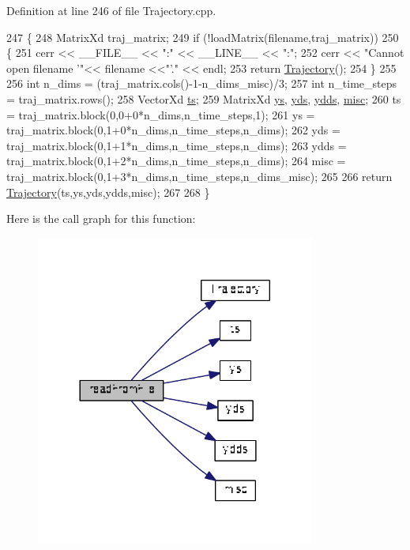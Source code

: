 Definition at line 246 of file Trajectory.\+cpp.


\begin{DoxyCode}
247 \{
248   MatrixXd traj\_matrix;
249   \textcolor{keywordflow}{if} (!loadMatrix(filename,traj\_matrix))
250   \{ 
251     cerr << \_\_FILE\_\_ << \textcolor{stringliteral}{":"} << \_\_LINE\_\_ << \textcolor{stringliteral}{":"};
252     cerr << \textcolor{stringliteral}{"Cannot open filename '"}<< filename <<\textcolor{stringliteral}{"'."} << endl;
253     \textcolor{keywordflow}{return} \hyperlink{classDmpBbo_1_1Trajectory_aa635b61a4223224b821d156a27dbb2b8}{Trajectory}();
254   \}
255   
256   \textcolor{keywordtype}{int} n\_dims       = (traj\_matrix.cols()-1-n\_dims\_misc)/3;
257   \textcolor{keywordtype}{int} n\_time\_steps = traj\_matrix.rows();
258   VectorXd \hyperlink{classDmpBbo_1_1Trajectory_a0ac526fb2e2e77134906a4b657d795d2}{ts}; 
259   MatrixXd \hyperlink{classDmpBbo_1_1Trajectory_a7e10cffc4d5b8099986c835f9337eab4}{ys}, \hyperlink{classDmpBbo_1_1Trajectory_ad5772d5db1c6af36cf1de2eed2447702}{yds}, \hyperlink{classDmpBbo_1_1Trajectory_ac2ce234816063eeeead69a146651fef7}{ydds}, \hyperlink{classDmpBbo_1_1Trajectory_a4bd0eca2780012731ff1b64341be1cbc}{misc};
260   ts   = traj\_matrix.block(0,0+0*n\_dims,n\_time\_steps,1);
261   ys   = traj\_matrix.block(0,1+0*n\_dims,n\_time\_steps,n\_dims);
262   yds  = traj\_matrix.block(0,1+1*n\_dims,n\_time\_steps,n\_dims);
263   ydds = traj\_matrix.block(0,1+2*n\_dims,n\_time\_steps,n\_dims);
264   misc = traj\_matrix.block(0,1+3*n\_dims,n\_time\_steps,n\_dims\_misc);
265   
266   \textcolor{keywordflow}{return} \hyperlink{classDmpBbo_1_1Trajectory_aa635b61a4223224b821d156a27dbb2b8}{Trajectory}(ts,ys,yds,ydds,misc);
267 
268 \}
\end{DoxyCode}


Here is the call graph for this function\+:
\nopagebreak
\begin{figure}[H]
\begin{center}
\leavevmode
\includegraphics[width=260pt]{classDmpBbo_1_1Trajectory_aac7e666c7fa5ea89ec1ba884e0a118a0_cgraph}
\end{center}
\end{figure}


